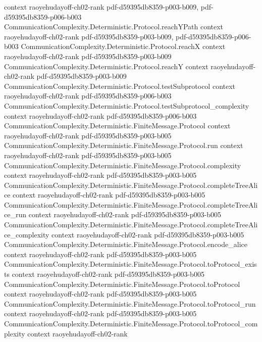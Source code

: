 \begin{theorem}
  {context}
  {raoyehudayoff-ch02-rank}
  {pdf-d59395db8359-p003-b009,
    pdf-d59395db8359-p006-b003}
\proofstep
  {CommunicationComplexity.Deterministic.Protocol.reachYPath}
  {context}
  {raoyehudayoff-ch02-rank}
  {pdf-d59395db8359-p003-b009,
    pdf-d59395db8359-p006-b003}
\proofstep
  {CommunicationComplexity.Deterministic.Protocol.reachX}
  {context}
  {raoyehudayoff-ch02-rank}
  {pdf-d59395db8359-p003-b009}
\proofstep
  {CommunicationComplexity.Deterministic.Protocol.reachY}
  {context}
  {raoyehudayoff-ch02-rank}
  {pdf-d59395db8359-p003-b009}
\proofstep
  {CommunicationComplexity.Deterministic.Protocol.testSubprotocol}
  {context}
  {raoyehudayoff-ch02-rank}
  {pdf-d59395db8359-p006-b003}
\proofstep
  {CommunicationComplexity.Deterministic.Protocol.testSubprotocol_complexity}
  {context}
  {raoyehudayoff-ch02-rank}
  {pdf-d59395db8359-p006-b003}
\proofstep
  {CommunicationComplexity.Deterministic.FiniteMessage.Protocol}
  {context}
  {raoyehudayoff-ch02-rank}
  {pdf-d59395db8359-p003-b005}
\proofstep
  {CommunicationComplexity.Deterministic.FiniteMessage.Protocol.run}
  {context}
  {raoyehudayoff-ch02-rank}
  {pdf-d59395db8359-p003-b005}
\proofstep
  {CommunicationComplexity.Deterministic.FiniteMessage.Protocol.complexity}
  {context}
  {raoyehudayoff-ch02-rank}
  {pdf-d59395db8359-p003-b005}
\proofstep
  {CommunicationComplexity.Deterministic.FiniteMessage.Protocol.completeTreeAlice}
  {context}
  {raoyehudayoff-ch02-rank}
  {pdf-d59395db8359-p003-b005}
\proofstep
  {CommunicationComplexity.Deterministic.FiniteMessage.Protocol.completeTreeAlice_run}
  {context}
  {raoyehudayoff-ch02-rank}
  {pdf-d59395db8359-p003-b005}
\proofstep
  {CommunicationComplexity.Deterministic.FiniteMessage.Protocol.completeTreeAlice_complexity}
  {context}
  {raoyehudayoff-ch02-rank}
  {pdf-d59395db8359-p003-b005}
\proofstep
  {CommunicationComplexity.Deterministic.FiniteMessage.Protocol.encode_alice}
  {context}
  {raoyehudayoff-ch02-rank}
  {pdf-d59395db8359-p003-b005}
\proofstep
  {CommunicationComplexity.Deterministic.FiniteMessage.Protocol.toProtocol_exists}
  {context}
  {raoyehudayoff-ch02-rank}
  {pdf-d59395db8359-p003-b005}
\proofstep
  {CommunicationComplexity.Deterministic.FiniteMessage.Protocol.toProtocol}
  {context}
  {raoyehudayoff-ch02-rank}
  {pdf-d59395db8359-p003-b005}
\proofstep
  {CommunicationComplexity.Deterministic.FiniteMessage.Protocol.toProtocol_run}
  {context}
  {raoyehudayoff-ch02-rank}
  {pdf-d59395db8359-p003-b005}
\proofstep
  {CommunicationComplexity.Deterministic.FiniteMessage.Protocol.toProtocol_complexity}
  {context}
  {raoyehudayoff-ch02-rank}

\end{theorem}

